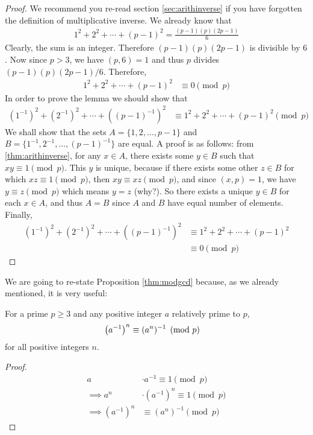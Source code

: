 	\begin{proof}
		We recommend you re-read section \eqref{sec:arithinverse} if you have forgotten the definition of multiplicative inverse. We already know that
			\begin{align*}
				1^2+2^2+\cdots+(p-1)^2 = \frac{(p-1)(p)(2p-1)}{6}
			\end{align*}
		Clearly, the sum is an integer. Therefore $(p-1)(p)(2p-1)$ is divisible by $6$. Now since $p>3$, we have $(p,6)=1$ and thus $p$ divides $(p-1)(p)(2p-1)/6$. Therefore,
			\begin{align*}
				1^2+2^2+\cdots+(p-1)^2
					& \equiv 0 \pmod p
			\end{align*}
		In order to prove the lemma we should show that
			\begin{align*}
				(1^{-1})^2+(2^{-1})^2+\cdots+((p-1)^{-1})^2
					& \equiv 1^2+2^2+\cdots+(p-1)^2 \pmod p
			\end{align*}
		We shall show that the sets $A=\{1,2,\ldots,p-1\}$ and $B=\{1^{-1}, 2^{-1},\ldots,(p-1)^{-1}\}$ are equal. A proof is as follows: from \autoref{thm:arithinverse}, for any $x \in A$, there exists some $y \in B$ such that $xy \equiv 1 \pmod p$. This $y$ is unique, because if there exists some other $z \in B$ for which $xz \equiv 1 \pmod p$, then $xy \equiv xz \pmod p$, and since $(x,p)=1$, we have $y \equiv z \pmod p$ which means $y=z$ (why?). So there exists a unique $y\in B$ for each $x \in A$, and thus $A=B$ since $A$ and $B$ have equal number of elements. Finally,
			\begin{align*}
				(1^{-1})^2+(2^{-1})^2+\cdots+((p-1)^{-1})^2
					& \equiv 1^2+2^2+\cdots+(p-1)^2\\
					& \equiv 0 \pmod p
			\end{align*}
	\end{proof}
We are going to re-state Proposition \ref{thm:modgcd} because, as we already mentioned, it is very useful:
	\begin{lemma}\label{lem:wolstproof3}
		For a prime $p\geq 3$ and any positive integer $a$ relatively prime to $p$,
			\begin{align*}
				\left(a^{-1}\right)^{n}
					& \equiv (a^n)^{-1} \pmod p
			\end{align*}
		for all positive integers $n$.
	\end{lemma}

	\begin{proof}
		\begin{align*}
			a
				& \cdot a^{-1} \equiv 1 \pmod p\\
			\implies a^n
				& \cdot (a^{-1})^n \equiv 1 \pmod p\\
			\implies(a^{-1})^n
				& \equiv (a^n)^{-1} \pmod p
		\end{align*}

	\end{proof}

